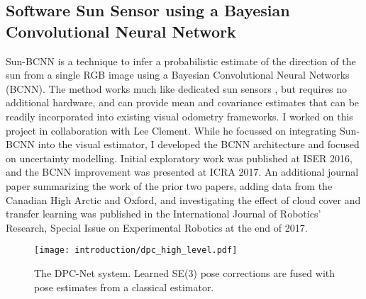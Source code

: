 \subsection{Software Sun Sensor using a Bayesian Convolutional Neural Network}
Sun-BCNN is a technique to infer a probabilistic estimate of the direction of the sun from a single RGB image using a Bayesian Convolutional Neural Networks (BCNN). The method works much like dedicated sun sensors \citep{Lambert2012-sn}, but requires no additional hardware, and can provide mean and covariance estimates that can be readily incorporated into existing visual odometry frameworks. I worked on this project in collaboration with Lee Clement. While he focussed on integrating Sun-BCNN into the visual estimator, I developed the BCNN architecture and focused on uncertainty modelling. Initial exploratory work was published at ISER 2016, and the BCNN improvement was presented at ICRA 2017. An additional journal paper summarizing the work of the prior two papers, adding data from the Canadian High Arctic and Oxford, and investigating the effect of cloud cover and transfer learning was published in the International Journal of Robotics' Research, Special Issue on Experimental Robotics at the end of 2017.



\begin{figure}
\begin{center}
		\texttt{[image: introduction/dpc\_high\_level.pdf]}
		\caption{The DPC-Net system. Learned SE(3) pose corrections are fused with pose estimates from a classical estimator.}
  	\label{fig:dpc_system}
\end{center}

\end{figure}


